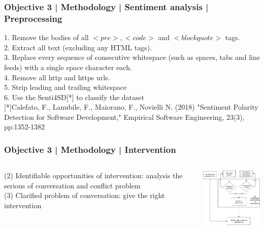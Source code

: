\documentclass{beamer}
\begin{document}
\begin{frame}
\frametitle{Objective 3 | Methodology | Sentiment analysis | Preprocessing}
1. Remove the bodies of all $<pre>, <code>$ and $<blockquote>$ tags. \\
2. Extract all text (excluding any HTML tags).\\
3. Replace every sequence of consecutive whitespace (such as spaces, tabs and line\\
feeds) with a single space character each.\\
4. Remove all http and https urls.\\
5. Strip leading and trailing whitespace\\
6. Use the Senti4SD[*] to classify the dataset \\
{\tiny [*]Calefato, F., Lanubile, F., Maiorano, F., Novielli N. (2018) "Sentiment Polarity Detection for Software Development," Empirical Software Engineering, 23(3), pp:1352-1382}

\end{frame}



\begin{frame}
\frametitle{Objective 3 | Methodology | Intervention}
\begin{columns}
	
	\begin{column}{.45\textwidth}
		(2) Identifiable opportunities of intervention: analysis the serious of conversation and conflict problem \\
		
		
		(3) Clarified problem of conversation: give the right intervention\\
	
	\end{column}
	\begin{column}{.55\textwidth}
		\includegraphics[width=50mm]{tsv3.png}	
	\end{column}
	
\end{columns}
\end{frame}
\end{document}
